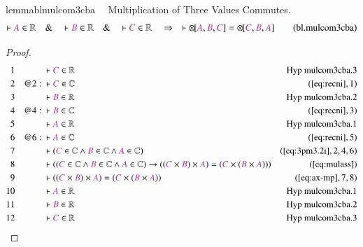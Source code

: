 \begin{restatable}{lemma}{blmulcom3cba}~~ Multiplication of Three Values
Commutes.
\begin{align}
\vdash \mc{A} \in \mathbb{R}\quad\&\quad \vdash \mc{B} \in
    \mathbb{R}\quad\&\quad \vdash \mc{C} \in \mathbb{R}\quad\Rightarrow\quad
    \vdash {\otimes\hspace{-1pt}[} \mc{A} , \mc{B} , \mc{C} ] =
    {\otimes\hspace{-1pt}[} \mc{C} , \mc{B} , \mc{A}
    ]\label{eq:bl.mulcom3cba}\tag{bl.mulcom3cba}
\end{align}
\end{restatable}

\begin{proof}
\begin{align}
  1 &&  & \vdash \mc{C} \in
\mathbb{R}&\text{Hyp~mulcom3cba.3}\notag%
  \\ 2 && @2:\  & \vdash \mc{C} \in \mathbb{C}&(\mbox{\ref{eq:recni}},1)\notag
  \\ 3 &&  & \vdash \mc{B} \in
\mathbb{R}&\text{Hyp~mulcom3cba.2}\notag%
  \\ 4 && @4:\  & \vdash \mc{B} \in \mathbb{C}&(\mbox{\ref{eq:recni}},3)\notag
  \\ 5 &&  & \vdash \mc{A} \in
\mathbb{R}&\text{Hyp~mulcom3cba.1}\notag%
  \\ 6 && @6:\  & \vdash \mc{A} \in \mathbb{C}&(\mbox{\ref{eq:recni}},5)\notag
  \\ 7 &&  & \vdash ( \mc{C} \in \mathbb{C} \wedge \mc{B} \in \mathbb{C} \wedge
      \mc{A} \in \mathbb{C}
      )&(\mbox{\ref{eq:3pm3.2i}},2,4,6)\notag
  \\ 8 &&  & \vdash ( ( \mc{C} \in \mathbb{C} \wedge \mc{B} \in \mathbb{C}
      \wedge \mc{A} \in \mathbb{C} ) \rightarrow ( ( \mc{C}
      \times \mc{B} ) \times \mc{A} ) = ( \mc{C} \times (
      \mc{B} \times \mc{A} ) )
      )&(\mbox{\ref{eq:mulass}})\notag
  \\ 9 &&  & \vdash ( ( \mc{C} \times \mc{B} ) \times \mc{A} ) = ( \mc{C} \times (
      \mc{B} \times \mc{A} )
      )&(\mbox{\ref{eq:ax-mp}},7,8)\notag
  \\ 10 &&  & \vdash \mc{A} \in
\mathbb{R}&\text{Hyp~mulcom3cba.1}\notag%
  \\ 11 &&  & \vdash \mc{B} \in
\mathbb{R}&\text{Hyp~mulcom3cba.2}\notag%
  \\ 12 &&  & \vdash \mc{C} \in
\mathbb{R}&\text{Hyp~mulcom3cba.3}\notag%

\end{align}
\end{proof}
